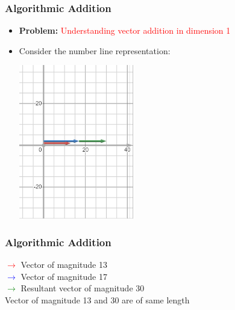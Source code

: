 \begin{frame}
    \frametitle{Algorithmic Addition}
    \begin{itemize}
        \item \textbf{Problem:} \textcolor{red}{Understanding vector addition in dimension 1}
        \item Consider the number line representation:
        \begin{center}
            \includegraphics[width=0.4\textwidth]{figures/general/vector.png}
           
        \end{center}
    \end{itemize}
\end{frame}



\begin{frame}
\frametitle{Algorithmic Addition}
 \vspace{0.3cm}
            \textcolor{red}{$\boldsymbol{\rightarrow}$} Vector of magnitude 13\\
            \textcolor{blue}{$\boldsymbol{\rightarrow}$} Vector of magnitude 17\\
            \textcolor{green}{$\boldsymbol{\rightarrow}$} Resultant vector of magnitude 30\\
            \text Vector of magnitude 13 and 30 are of same length 
\end{frame}



